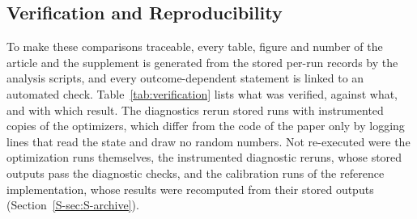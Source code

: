 \subsection{Verification and Reproducibility}
\label{sec:validation}
To make these comparisons traceable, every table, figure and number of the article and the supplement is generated from the stored per-run records by the analysis scripts, and every outcome-dependent statement is linked to an automated check. Table~\ref{tab:verification} lists what was verified, against what, and with which result. The diagnostics rerun stored runs with instrumented copies of the optimizers, which differ from the code of the paper only by logging lines that read the state and draw no random numbers. Not re-executed were the optimization runs themselves, the instrumented diagnostic reruns, whose stored outputs pass the diagnostic checks, and the calibration runs of the reference implementation, whose results were recomputed from their stored outputs (Section~\ref{S-sec:S-archive}).

